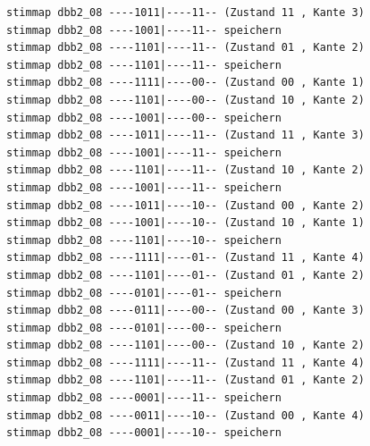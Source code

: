 \documentclass[fleqn]{article}
\begin{document}
\begin{lstlisting}
stimmap dbb2_08 ----1011|----11-- (Zustand 11 , Kante 3)
stimmap dbb2_08 ----1001|----11-- speichern
stimmap dbb2_08 ----1101|----11-- (Zustand 01 , Kante 2)
stimmap dbb2_08 ----1101|----11-- speichern
stimmap dbb2_08 ----1111|----00-- (Zustand 00 , Kante 1)
stimmap dbb2_08 ----1101|----00-- (Zustand 10 , Kante 2)
stimmap dbb2_08 ----1001|----00-- speichern
stimmap dbb2_08 ----1011|----11-- (Zustand 11 , Kante 3)
stimmap dbb2_08 ----1001|----11-- speichern
stimmap dbb2_08 ----1101|----11-- (Zustand 10 , Kante 2)
stimmap dbb2_08 ----1001|----11-- speichern
stimmap dbb2_08 ----1011|----10-- (Zustand 00 , Kante 2)
stimmap dbb2_08 ----1001|----10-- (Zustand 10 , Kante 1)
stimmap dbb2_08 ----1101|----10-- speichern
stimmap dbb2_08 ----1111|----01-- (Zustand 11 , Kante 4)
stimmap dbb2_08 ----1101|----01-- (Zustand 01 , Kante 2)
stimmap dbb2_08 ----0101|----01-- speichern
stimmap dbb2_08 ----0111|----00-- (Zustand 00 , Kante 3)
stimmap dbb2_08 ----0101|----00-- speichern
stimmap dbb2_08 ----1101|----00-- (Zustand 10 , Kante 2)
stimmap dbb2_08 ----1111|----11-- (Zustand 11 , Kante 4)
stimmap dbb2_08 ----1101|----11-- (Zustand 01 , Kante 2)
stimmap dbb2_08 ----0001|----11-- speichern
stimmap dbb2_08 ----0011|----10-- (Zustand 00 , Kante 4)
stimmap dbb2_08 ----0001|----10-- speichern
\end{lstlisting}
\end{document}
